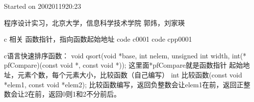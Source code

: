 \documentclass[UTF8]{article}
\begin{document}
Started on 2002011920:23

程序设计实习，北京大学，信息科学技术学院
郭炜，刘家瑛

c 相关
函数指针，指向函数起始地址
code c0001
code cpp0001



c语言快速排序函数：
void qsort(void *base, int nelem, unsigned int width, int(* pfCompare)(const void *, const void *));
这里面*pfCompare就是函数指针
起始地址，元素个数，每个元素大小，比较函数（自己编写）
int 比较函数(const void *elem1, const void *elem2);
比较函数编写，返回负整数会让elem1在前，返回正整数会让2在前，返回0则1和2不分前后。
\end{document}
